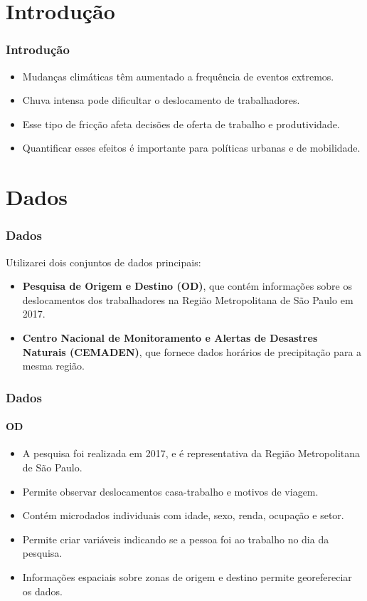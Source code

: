 

\section{Introdução}
\begin{frame}
    \frametitle{Introdução}
    \begin{itemize}
    \item Mudanças climáticas têm aumentado a frequência de eventos extremos.
    \item Chuva intensa pode dificultar o deslocamento de trabalhadores.
    \item Esse tipo de fricção afeta decisões de oferta de trabalho e produtividade.
    \item Quantificar esses efeitos é importante para políticas urbanas e de mobilidade.
    \end{itemize}
\end{frame}

\section{Dados}
\begin{frame}
    \frametitle{Dados}
    Utilizarei dois conjuntos de dados principais:
    \begin{itemize}
        \item \textbf{Pesquisa de Origem e Destino (OD)}, que contém informações sobre os deslocamentos dos trabalhadores na Região Metropolitana de São Paulo em 2017.
        \item \textbf{Centro Nacional de Monitoramento e Alertas de Desastres Naturais (CEMADEN)}, que fornece dados horários de precipitação para a mesma região.
    \end{itemize}
\end{frame}


\begin{frame}
    \frametitle{Dados}
    \framesubtitle{OD}
    \begin{itemize}
        \item A pesquisa foi realizada em 2017, e é representativa da Região Metropolitana de São Paulo.
        \item Permite observar deslocamentos casa-trabalho e motivos de viagem.
        \item Contém microdados individuais com idade, sexo, renda, ocupação e setor.
    \item Permite criar variáveis indicando se a pessoa foi ao trabalho no dia da pesquisa.
    \item Informações espaciais sobre zonas de origem e destino permite georefereciar os dados.
    \end{itemize}
\end{frame}

